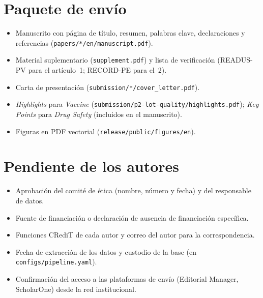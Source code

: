 \documentclass[11pt]{article}
\begin{document}
\section{Paquete de envío}
\begin{itemize}[leftmargin=*]
\item Manuscrito con página de título, resumen, palabras clave, declaraciones y referencias
  (\nolinkurl{papers/*/en/manuscript.pdf}).
\item Material suplementario (\nolinkurl{supplement.pdf}) y lista de verificación (READUS-PV para el
  artículo~1; RECORD-PE para el~2).
\item Carta de presentación (\nolinkurl{submission/*/cover_letter.pdf}).
\item \emph{Highlights} para \emph{Vaccine} (\nolinkurl{submission/p2-lot-quality/highlights.pdf});
  \emph{Key Points} para \emph{Drug Safety} (incluidos en el manuscrito).
\item Figuras en PDF vectorial (\nolinkurl{release/public/figures/en}).
\end{itemize}

\section{Pendiente de los autores}
\begin{itemize}[leftmargin=*]
\item Aprobación del comité de ética (nombre, número y fecha) y del responsable de datos.
\item Fuente de financiación o declaración de ausencia de financiación específica.
\item Funciones CRediT de cada autor y correo del autor para la correspondencia.
\item Fecha de extracción de los datos y custodio de la base (en \nolinkurl{configs/pipeline.yaml}).
\item Confirmación del acceso a las plataformas de envío (Editorial Manager, ScholarOne) desde la red
  institucional.
\end{itemize}
\end{document}
